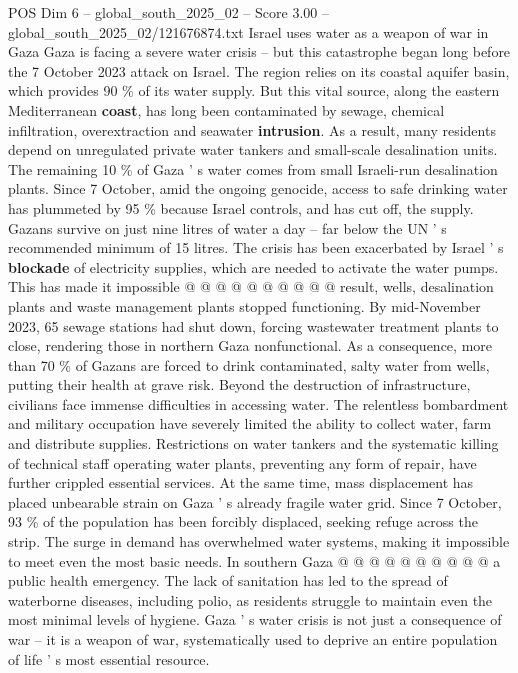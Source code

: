 \begin{textsample}{POS Dim 6 – global\_south\_2025\_02 – Score 3.00 – global\_south\_2025\_02/121676874.txt}  \label{ex:f6_pos_404}
Israel uses water as a weapon of war in Gaza Gaza is facing a severe water crisis -- but this catastrophe began long before the 7 October 2023 attack on Israel.
The region relies on its coastal aquifer basin, which provides 90 \% of its water supply.
But this vital source, along the eastern Mediterranean \textbf{coast}, has long been contaminated by sewage, chemical infiltration, overextraction and seawater \textbf{intrusion}.
As a result, many residents depend on unregulated private water tankers and small-scale desalination units.
The remaining 10 \% of Gaza ' s water comes from small Israeli-run desalination plants.
Since 7 October, amid the ongoing genocide, access to safe drinking water has plummeted by 95 \% because Israel controls, and has cut off, the supply.
Gazans survive on just nine litres of water a day -- far below the UN ' s recommended minimum of 15 litres.
The crisis has been exacerbated by Israel ' s \textbf{blockade} of electricity supplies, which are needed to activate the water pumps.
This has made it impossible @ @ @ @ @ @ @ @ @ @ result, wells, desalination plants and waste management plants stopped functioning.
By mid-November 2023, 65 sewage stations had shut down, forcing wastewater treatment plants to close, rendering those in northern Gaza nonfunctional.
As a consequence, more than 70 \% of Gazans are forced to drink contaminated, salty water from wells, putting their health at grave risk.
Beyond the destruction of infrastructure, civilians face immense difficulties in accessing water.
The relentless bombardment and military occupation have severely limited the ability to collect water, farm and distribute supplies.
Restrictions on water tankers and the systematic killing of technical staff operating water plants, preventing any form of repair, have further crippled essential services.
At the same time, mass displacement has placed unbearable strain on Gaza ' s already fragile water grid.
Since 7 October, 93 \% of the population has been forcibly displaced, seeking refuge across the strip.
The surge in demand has overwhelmed water systems, making it impossible to meet even the most basic needs.
In southern Gaza @ @ @ @ @ @ @ @ @ @ a public health emergency.
The lack of sanitation has led to the spread of waterborne diseases, including polio, as residents struggle to maintain even the most minimal levels of hygiene.
Gaza ' s water crisis is not just a consequence of war -- it is a weapon of war, systematically used to deprive an entire population of life ' s most essential resource.

\end{textsample}
